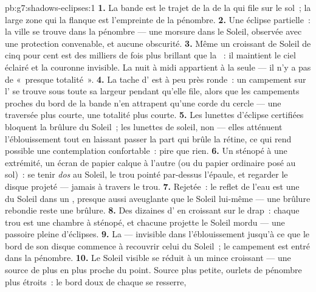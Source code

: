 \begin{solution}{pb:g7:shadows-eclipses:1}
\textbf{1.} La bande est le trajet de la  de la  qui
file sur le sol~; la large zone qui la flanque est l'empreinte de la
pénombre.
\textbf{2.} Une éclipse partielle~: la ville se trouve dans la
pénombre --- une morsure dans le Soleil, observée avec une
protection convenable, et aucune obscurité.
\textbf{3.} Même un croissant de Soleil de cinq pour cent est des
milliers de fois plus brillant que la ~: il maintient le
ciel éclairé et la couronne invisible. La nuit à midi appartient à la
seule  --- il n'y a pas de «~presque totalité~».
\textbf{4.} La tache d' est à peu près ronde~: un campement sur
l' se trouve sous toute sa largeur pendant qu'elle file, alors que
les campements proches du bord de la bande n'en attrapent qu'une
corde du cercle --- une traversée plus courte, une totalité plus
courte.
\textbf{5.} Les lunettes d'éclipse certifiées bloquent la brûlure du
Soleil~; les lunettes de soleil, non --- elles atténuent
l'éblouissement tout en laissant passer la part qui brûle la rétine,
ce qui rend possible une contemplation confortable~: pire que rien.
\textbf{6.} Un sténopé à une extrémité, un écran de papier calque à
l'autre (ou du papier ordinaire posé au sol)~: se tenir \emph{dos} au
Soleil, le trou pointé par-dessus l'épaule, et regarder le disque
projeté --- jamais à travers le trou.
\textbf{7.} Rejetée~: le reflet de l'eau est une  du Soleil dans
un , presque aussi aveuglante que le Soleil lui-même --- une
brûlure rebondie reste une brûlure.
\textbf{8.} Des dizaines d' en croissant sur le drap~: chaque
trou est une chambre à sténopé, et chacune projette le Soleil mordu
--- une passoire pleine d'éclipses.
\textbf{9.} La  --- invisible dans l'éblouissement jusqu'à ce que
le bord de son disque commence à recouvrir celui du Soleil~; le
campement est entré dans la pénombre.
\textbf{10.} Le Soleil visible se réduit à un mince croissant --- une
source de plus en plus proche du point. Source plus petite, ourlets
de pénombre plus étroits~: le bord doux de chaque  se resserre,

\end{solution}
